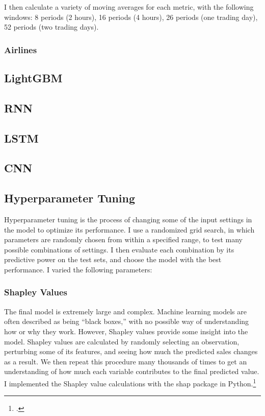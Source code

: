 \documentclass[12pt]{article}
\begin{document}
I then calculate a variety of moving averages for each metric, with the following windows: 8 periods (2 hours), 16 periods (4 hours), 26 periods (one trading day), 52 periods (two trading days).

\subsubsection{Airlines}

\subsection{LightGBM}

\subsection{RNN}

\subsection{LSTM}

\subsection{CNN}

\subsection{Hyperparameter Tuning}
Hyperparameter tuning is the process of changing some of the input settings in the model to optimize its performance. I use a randomized grid search, in which parameters are randomly chosen from within a specified range, to test many possible combinations of settings. I then evaluate each combination by its predictive power on the test sets, and choose the model with the best performance. I varied the following parameters:

\subsubsection{Shapley Values}
The final model is extremely large and complex. Machine learning models are often described as being ``black boxes,'' with no possible way of understanding how or why they work. However, Shapley values provide some insight into the model. Shapley values are calculated by randomly selecting an observation, perturbing some of its features, and seeing how much the predicted sales changes as a result. We then repeat this procedure many thousands of times to get an understanding of how much each variable contributes to the final predicted value. I implemented the Shapley value calculations with the \textsf{shap} package in Python.\footnote{\citet{shap}.}
\end{document}
